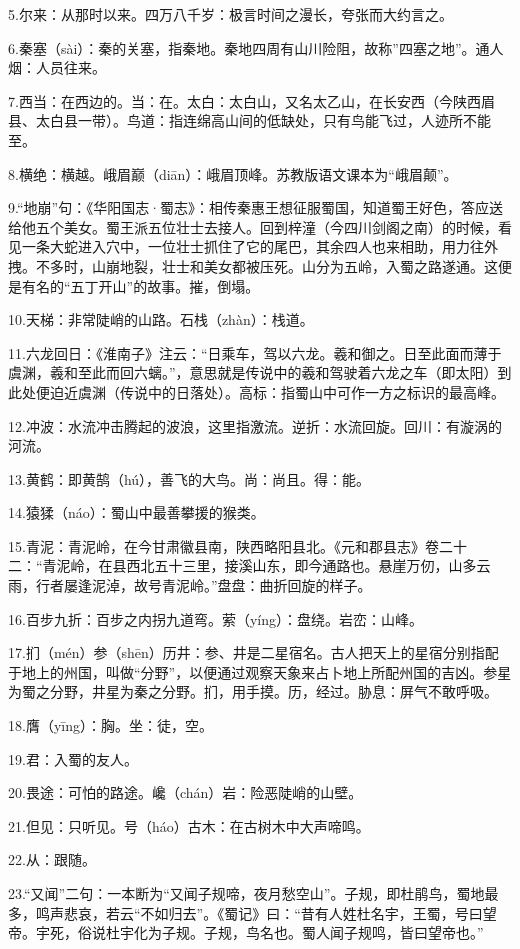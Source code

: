 \documentclass[letterpaper,10pt,english]{sphinxmanual}
\begin{document}
5.尔来：从那时以来。四万八千岁：极言时间之漫长，夸张而大约言之。

6.秦塞（sài）：秦的关塞，指秦地。秦地四周有山川险阻，故称”四塞之地”。通人烟：人员往来。

7.西当：在西边的。当：在。太白：太白山，又名太乙山，在长安西（今陕西眉县、太白县一带）。鸟道：指连绵高山间的低缺处，只有鸟能飞过，人迹所不能至。

8.横绝：横越。峨眉巅（diān）：峨眉顶峰。苏教版语文课本为“峨眉颠”。

9.“地崩”句：《华阳国志·蜀志》：相传秦惠王想征服蜀国，知道蜀王好色，答应送给他五个美女。蜀王派五位壮士去接人。回到梓潼（今四川剑阁之南）的时候，看见一条大蛇进入穴中，一位壮士抓住了它的尾巴，其余四人也来相助，用力往外拽。不多时，山崩地裂，壮士和美女都被压死。山分为五岭，入蜀之路遂通。这便是有名的“五丁开山”的故事。摧，倒塌。

10.天梯：非常陡峭的山路。石栈（zhàn）：栈道。

11.六龙回日：《淮南子》注云：“日乘车，驾以六龙。羲和御之。日至此面而薄于虞渊，羲和至此而回六螭。”，意思就是传说中的羲和驾驶着六龙之车（即太阳）到此处便迫近虞渊（传说中的日落处）。高标：指蜀山中可作一方之标识的最高峰。

12.冲波：水流冲击腾起的波浪，这里指激流。逆折：水流回旋。回川：有漩涡的河流。

13.黄鹤：即黄鹄（hú），善飞的大鸟。尚：尚且。得：能。

14.猿猱（náo）：蜀山中最善攀援的猴类。

15.青泥：青泥岭，在今甘肃徽县南，陕西略阳县北。《元和郡县志》卷二十二：“青泥岭，在县西北五十三里，接溪山东，即今通路也。悬崖万仞，山多云雨，行者屡逢泥淖，故号青泥岭。”盘盘：曲折回旋的样子。

16.百步九折：百步之内拐九道弯。萦（yíng）：盘绕。岩峦：山峰。

17.扪（mén）参（shēn）历井：参、井是二星宿名。古人把天上的星宿分别指配于地上的州国，叫做“分野”，以便通过观察天象来占卜地上所配州国的吉凶。参星为蜀之分野，井星为秦之分野。扪，用手摸。历，经过。胁息：屏气不敢呼吸。

18.膺（yīng）：胸。坐：徒，空。

19.君：入蜀的友人。

20.畏途：可怕的路途。巉（chán）岩：险恶陡峭的山壁。

21.但见：只听见。号（háo）古木：在古树木中大声啼鸣。

22.从：跟随。

23.“又闻”二句：一本断为“又闻子规啼，夜月愁空山”。子规，即杜鹃鸟，蜀地最多，鸣声悲哀，若云“不如归去”。《蜀记》曰：“昔有人姓杜名宇，王蜀，号曰望帝。宇死，俗说杜宇化为子规。子规，鸟名也。蜀人闻子规鸣，皆曰望帝也。”
\end{document}
